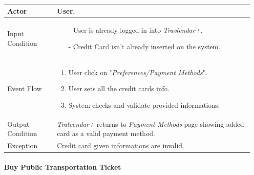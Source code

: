 		\begin{tabular}{| l | p{} | }
			\hline
			\hline
			Actor	&		User. \\
			\hline
			Input Condition		&		\begin{itemize}
													\item[-] User is already logged in into \textit{Travlendar+}.
													\item[-] Credit Card isn't already inserted on the system.
												\end{itemize} \\
			\hline
			Event Flow		&		\begin{enumerate}
												\item User click on "\textit{Preferences/Payment Methods}".
												\item User sets all the credit cards info.
												\item System checks and validate provided informations.
											\end{enumerate} \\
			\hline
			Output Condition		&		\textit{Tralvendar+} returns to \textit{Payment Methods} page showing added card as a valid payment method. \\
			\hline		
			Exception		&		Credit card given informations are invalid. \\
			\hline
			\hline
		\end{tabular}


	\paragraph{Buy Public Transportation Ticket}
	
